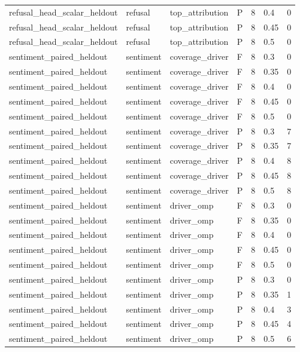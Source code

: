 \begin{tabular}{lllllll}
refusal\_head\_scalar\_heldout & refusal & top\_attribution & P & 8 & 0.4 & 0 \\
refusal\_head\_scalar\_heldout & refusal & top\_attribution & P & 8 & 0.45 & 0 \\
refusal\_head\_scalar\_heldout & refusal & top\_attribution & P & 8 & 0.5 & 0 \\
sentiment\_paired\_heldout & sentiment & coverage\_driver & F & 8 & 0.3 & 0 \\
sentiment\_paired\_heldout & sentiment & coverage\_driver & F & 8 & 0.35 & 0 \\
sentiment\_paired\_heldout & sentiment & coverage\_driver & F & 8 & 0.4 & 0 \\
sentiment\_paired\_heldout & sentiment & coverage\_driver & F & 8 & 0.45 & 0 \\
sentiment\_paired\_heldout & sentiment & coverage\_driver & F & 8 & 0.5 & 0 \\
sentiment\_paired\_heldout & sentiment & coverage\_driver & P & 8 & 0.3 & 7 \\
sentiment\_paired\_heldout & sentiment & coverage\_driver & P & 8 & 0.35 & 7 \\
sentiment\_paired\_heldout & sentiment & coverage\_driver & P & 8 & 0.4 & 8 \\
sentiment\_paired\_heldout & sentiment & coverage\_driver & P & 8 & 0.45 & 8 \\
sentiment\_paired\_heldout & sentiment & coverage\_driver & P & 8 & 0.5 & 8 \\
sentiment\_paired\_heldout & sentiment & driver\_omp & F & 8 & 0.3 & 0 \\
sentiment\_paired\_heldout & sentiment & driver\_omp & F & 8 & 0.35 & 0 \\
sentiment\_paired\_heldout & sentiment & driver\_omp & F & 8 & 0.4 & 0 \\
sentiment\_paired\_heldout & sentiment & driver\_omp & F & 8 & 0.45 & 0 \\
sentiment\_paired\_heldout & sentiment & driver\_omp & F & 8 & 0.5 & 0 \\
sentiment\_paired\_heldout & sentiment & driver\_omp & P & 8 & 0.3 & 0 \\
sentiment\_paired\_heldout & sentiment & driver\_omp & P & 8 & 0.35 & 1 \\
sentiment\_paired\_heldout & sentiment & driver\_omp & P & 8 & 0.4 & 3 \\
sentiment\_paired\_heldout & sentiment & driver\_omp & P & 8 & 0.45 & 4 \\
sentiment\_paired\_heldout & sentiment & driver\_omp & P & 8 & 0.5 & 6 \\

\end{tabular}
